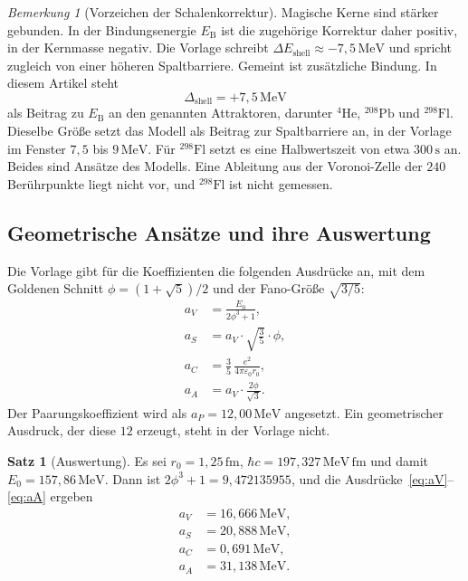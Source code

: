 \documentclass[11pt,a4paper]{article}
\theoremstyle{definition}
\newtheorem{satz}{Satz}[section]
\theoremstyle{remark}
\newtheorem{bemerkung}{Bemerkung}[section]
\newcommand{\EB}{E_{\mathrm{B}}}
\newcommand{\phig}{\phi}
\begin{document}
\begin{bemerkung}[Vorzeichen der Schalenkorrektur]
Magische Kerne sind stärker gebunden. In der Bindungsenergie \(\EB\) ist die zugehörige Korrektur daher positiv, in der Kernmasse negativ. Die Vorlage schreibt \(\Delta E_{\mathrm{shell}}\approx -7{,}5\,\mathrm{MeV}\) und spricht zugleich von einer höheren Spaltbarriere. Gemeint ist zusätzliche Bindung. In diesem Artikel steht
\begin{equation}
\Delta_{\mathrm{shell}}=+7{,}5\,\mathrm{MeV}
\end{equation}
als Beitrag zu \(\EB\) an den genannten Attraktoren, darunter \(^{4}\mathrm{He}\), \(^{208}\mathrm{Pb}\) und \(^{298}\mathrm{Fl}\). Dieselbe Größe setzt das Modell als Beitrag zur Spaltbarriere an, in der Vorlage im Fenster \(7{,}5\) bis \(9\,\mathrm{MeV}\). Für \(^{298}\mathrm{Fl}\) setzt es eine Halbwertszeit von etwa \(300\,\mathrm{s}\) an. Beides sind Ansätze des Modells. Eine Ableitung aus der Voronoi-Zelle der \(240\) Berührpunkte liegt nicht vor, und \(^{298}\mathrm{Fl}\) ist nicht gemessen.
\end{bemerkung}

\subsection{Geometrische Ansätze und ihre Auswertung}
\label{sec:auswertung}

Die Vorlage gibt für die Koeffizienten die folgenden Ausdrücke an, mit dem Goldenen Schnitt \(\phig=(1+\sqrt{5})/2\) und der Fano-Größe \(\sqrt{3/5}\):
\begin{align}
a_V &= \frac{E_0}{2\phig^3+1},
\label{eq:aV}\\
a_S &= a_V\cdot\sqrt{\frac{3}{5}}\cdot\phig,
\label{eq:aS}\\
a_C &= \frac{3}{5}\,\frac{e^2}{4\pi\varepsilon_0 r_0},
\label{eq:aC}\\
a_A &= a_V\cdot\frac{2\phig}{\sqrt{3}}.
\label{eq:aA}
\end{align}
Der Paarungskoeffizient wird als \(a_P=12{,}00\,\mathrm{MeV}\) angesetzt. Ein geometrischer Ausdruck, der diese \(12\) erzeugt, steht in der Vorlage nicht.

\begin{satz}[Auswertung]
\label{satz:auswertung}
Es sei \(r_0=1{,}25\,\mathrm{fm}\), \(\hbar c=197{,}327\,\mathrm{MeV\,fm}\) und damit \(E_0=157{,}86\,\mathrm{MeV}\). Dann ist \(2\phig^3+1=9{,}472135955\), und die Ausdrücke~\eqref{eq:aV}--\eqref{eq:aA} ergeben
\begin{align}
a_V &= 16{,}666\,\mathrm{MeV},\\
a_S &= 20{,}888\,\mathrm{MeV},\\
a_C &= 0{,}691\,\mathrm{MeV},\\
a_A &= 31{,}138\,\mathrm{MeV}.
\end{align}
\end{satz}
\end{document}
